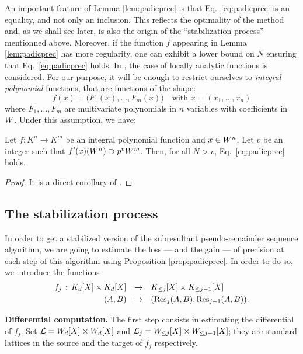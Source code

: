 \documentclass{sig-alternate}
\begin{document}
An important feature of Lemma \ref{lem:padicprec} is that 
Eq.~\eqref{eq:padicprec} is an equality, and not only an inclusion. 
This reflects the optimality of the method and, as we shall see later, 
is also the origin of the ``stabilization process'' mentionned above.
Moreover, if the function $f$ appearing in Lemma \ref{lem:padicprec} 
has more regularity, one can exhibit a lower bound on $N$ ensuring
that Eq.~\eqref{eq:padicprec} holds. In \cite{}, the case of locally 
analytic functions is considered. For our purpose, it will be enough 
to restrict ourselves to \emph{integral polynomial} functions, that
are functions of the shape:
$$f(x) = \big(F_1(x), \ldots, F_m(x)\big)
\quad \text{with } x = (x_1, \ldots, x_n)$$
where $F_1, \ldots, F_m$ are multivariate polynomials in $n$ variables
with coefficients in $W$. Under this assumption, we have:

\begin{prop}
\label{prop:padicprec}
Let $f : K^n \to K^m$ be an integral polynomial function and $x \in
W^n$. Let $v$ be an integer such that $f'(x)(W^n) \supset p^v W^m$.
Then, for all $N > v$, Eq.~\eqref{eq:padicprec} holds.
\end{prop}

\begin{proof}
It is a direct corollary of \cite[Proposition 3.12]{}.
\end{proof}

\subsection{The stabilization process}

In order to get a stabilized version of the subresultant 
pseudo-remainder sequence algorithm, we are going to estimate 
the loss --- and the gain --- of precision at each step of this 
algorithm using Proposition \ref{prop:padicprec}. In order to do
so, we introduce the functions
$$\begin{array}{rcl}
f_j \, : \, K_d[X] \times K_d[X] & \to & K_{\leq j}[X] \times 
K_{\leq j-1}[X] \smallskip \\
(A,B) & \mapsto & (\Res_j(A,B), \Res_{j-1}(A,B)).
\end{array}$$

\noindent
{\bf Differential computation.}
The first step consists in estimating the differential of $f_j$. 
Set $\mathcal L = W_d[X] \times W_d[X]$ and $\mathcal L_j = 
W_{\leq j}[X] \times W_{\leq j-1}[X]$; they are standard lattices
in the source and the target of $f_j$ respectively.
\end{document}
